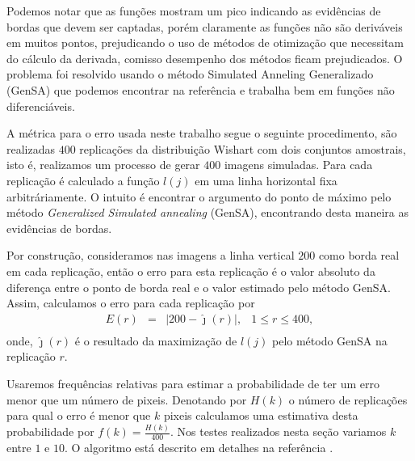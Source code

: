 \documentclass[conference]{IEEEtran}
\begin{document}
	Podemos notar que as funções mostram um pico indicando as evidências de bordas que devem ser captadas, porém claramente as funções não são deriváveis em muitos pontos, prejudicando o uso de métodos de otimização que necessitam do cálculo da derivada, comisso desempenho dos métodos ficam prejudicados. O problema foi resolvido usando o método Simulated Anneling Generalizado (GenSA) que podemos encontrar na referência \cite{xgsh} e trabalha bem em funções não diferenciáveis.
	
	A métrica para o erro usada neste trabalho segue o seguinte procedimento, são realizadas $400$ replicações da distribuição Wishart com dois conjuntos amostrais, isto é, realizamos um processo de gerar $400$ imagens simuladas. Para cada replicação é calculado a função $l(j)$ em uma linha horizontal fixa arbitráriamente. O intuito é encontrar o argumento do ponto de máximo pelo método {\it Generalized Simulated annealing} (GenSA), encontrando desta maneira as evidências de bordas.
	
	 Por construção, consideramos nas imagens a linha vertical $200$ como borda real em cada replicação, então o erro para esta replicação é o valor absoluto da diferença entre o ponto de borda real e o valor estimado pelo método GenSA. Assim, calculamos o erro para cada replicação por   
\begin{equation}\label{eq_12}
\begin{array}{llll}
	E(r) &=& |200 - \hat{\jmath}(r)|, & 1\leq r \leq 400,  \\
\end{array}
\end{equation}
onde, $\hat{\jmath}(r)$ é o resultado da maximização de $l(j)$ pelo método GenSA na replicação $r$.

Usaremos frequências relativas para estimar a probabilidade de ter um erro menor que um número de pixeis. Denotando por $H(k)$ o número de replicações para qual o erro é menor que $k$ pixeis calculamos uma estimativa desta probabilidade por $f(k)=\frac{H(k)}{400}$. Nos testes realizados nesta seção variamos $k$ entre $1$ e $10$. O algoritmo está descrito em detalhes na referência \cite{fbgm}. 
\end{document}
